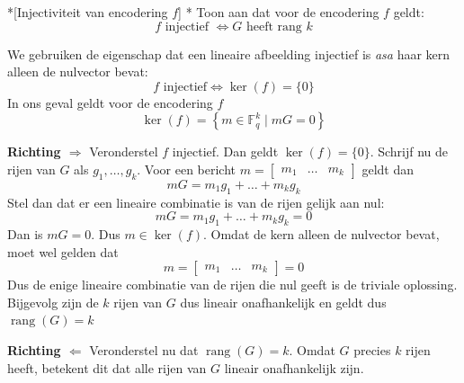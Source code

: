 \begin{niceexercise}*[Injectiviteit van encodering $f$]\label{ex:l8_injectiviteit-f}
    \nextpart[]*
    Toon aan dat voor de encodering $f$ geldt:
    \begin{equation*}
        f \text{ injectief } \iff G \text{ heeft rang } k
    \end{equation*}
\end{niceexercise}

We gebruiken de eigenschap dat een lineaire afbeelding injectief is \emph{asa} haar kern alleen de nulvector bevat:
\begin{equation*}
    f \text{ injectief} \iff \operatorname{ker}(f) = \{0\}
\end{equation*}
In ons geval geldt voor de encodering $f$
\begin{equation*}
    \operatorname{ker}(f) = \left\{ m \in \mathbb{F}_q^k \mid mG=0 \right\}
\end{equation*}

\textbf{Richting $\Rightarrow$} \newline
Veronderstel $f$ injectief. Dan geldt $\ker(f) = \{0\}$. Schrijf nu de rijen van $G$ als $g_1, \dots, g_k$. Voor een bericht $m = \begin{bmatrix}
    m_1 & \dots & m_k
\end{bmatrix}$ geldt dan
\begin{equation*}
    mG = m_1g_1 + \dots + m_kg_k
\end{equation*}
Stel dan dat er een lineaire combinatie is van de rijen gelijk aan nul:
\begin{equation*}
    mG = m_1g_1 + \dots + m_kg_k = 0
\end{equation*}
Dan is $mG=0$. Dus $m \in \ker(f)$. Omdat de kern alleen de nulvector bevat, moet wel gelden dat
\begin{equation*}
    m = \begin{bmatrix}
        m_1 & \dots & m_k
    \end{bmatrix} = 0
\end{equation*}
Dus de enige lineaire combinatie van de rijen die nul geeft is de triviale oplossing. Bijgevolg zijn de $k$ rijen van $G$ dus lineair onafhankelijk en geldt dus $\operatorname{rang}(G) = k$

\textbf{Richting $\Leftarrow$} \newline
Veronderstel nu dat $\operatorname{rang}(G) = k$. Omdat $G$ precies $k$ rijen heeft, betekent dit dat alle rijen van $G$ lineair onafhankelijk zijn.

